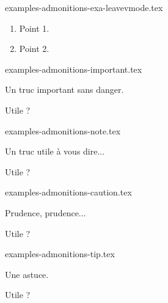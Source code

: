 \begin{filecontents*}[overwrite]{examples-admonitions-exa-leavevmode.tex}
\begin{tdocexa}
    \leavevmode
    \begin{enumerate}
        \item Point 1.

        \item Point 2.
    \end{enumerate}
\end{tdocexa}
\end{filecontents*}


\begin{filecontents*}[overwrite]{examples-admonitions-important.tex}
\begin{tdocimp}
    Un truc important sans danger.
\end{tdocimp}

\begin{tdocimp}
    Utile ?
\end{tdocimp}
\end{filecontents*}


\begin{filecontents*}[overwrite]{examples-admonitions-note.tex}
\begin{tdocnote}
    Un truc utile à vous dire...
\end{tdocnote}

\begin{tdocnote}
    Utile ?
\end{tdocnote}
\end{filecontents*}


\begin{filecontents*}[overwrite]{examples-admonitions-caution.tex}
\begin{tdoccaut}
    Prudence, prudence...
\end{tdoccaut}

\begin{tdoccaut}
    Utile ?
\end{tdoccaut}
\end{filecontents*}


\begin{filecontents*}[overwrite]{examples-admonitions-tip.tex}
\begin{tdoctip}
    Une astuce.
\end{tdoctip}

\begin{tdoctip}
    Utile ?
\end{tdoctip}
\end{filecontents*}


